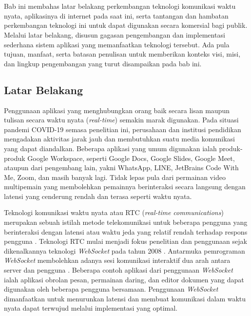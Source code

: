 \chapter{\babSatu}
\label{bab:1}
Bab ini membahas latar belakang perkembangan teknologi komunikasi waktu nyata, aplikasinya di internet pada saat ini, serta tantangan dan hambatan perkembangan teknologi ini untuk dapat digunakan secara komersial bagi publik. Melalui latar belakang, disusun gagasan pengembangan dan implementasi sederhana sistem aplikasi yang memanfaatkan teknologi tersebut. Ada pula tujuan, manfaat, serta batasan penulisan untuk memberikan konteks visi, misi, dan lingkup pengembangan yang turut disampaikan pada bab ini.

\section{Latar Belakang}
\label{sec:latarBelakang}
Penggunaan aplikasi yang menghubungkan orang baik secara lisan maupun tulisan secara waktu nyata (\textit{real-time}) semakin marak digunakan. Pada situasi pandemi COVID-19 semasa penelitian ini, perusahaan dan institusi pendidikan mengadakan aktivitas jarak jauh dan membutuhkan suatu media komunikasi yang dapat diandalkan. Beberapa aplikasi yang umum digunakan ialah produk-produk Google Workspace, seperti Google Docs, Google Slides, Google Meet, ataupun dari pengembang lain, yakni WhatsApp, LINE, JetBrains Code With Me, Zoom, dan masih banyak lagi. Tidak lepas pula dari permainan video multipemain yang membolehkan pemainnya berinteraksi secara langsung dengan latensi yang cenderung rendah dan terasa seperti waktu nyata.

Teknologi komunikasi waktu nyata atau RTC (\textit{real-time communications}) merupakan sebuah istilah metode telekomunikasi untuk beberapa pengguna yang berinteraksi dengan latensi atau waktu jeda yang relatif rendah terhadap respons pengguna \citep{arefin2013modified}. Teknologi RTC mulai menjadi fokus penelitian dan penggunaan sejak dikenalkannya teknologi \textit{WebSocket} pada tahun 2008 \citep{fette2011websocket, reynolds2008web}. Antarmuka pemrograman \textit{WebSocket} membolehkan adanya sesi komunikasi interaktif dua arah antara server dan pengguna \citep{fette2011websocket}. Beberapa contoh aplikasi dari penggunaan \textit{WebSocket} ialah aplikasi obrolan pesan, permainan daring, dan editor dokumen yang dapat digunakan oleh beberapa pengguna bersamaan. Penggunaan \textit{WebSocket} dimanfaatkan untuk menurunkan latensi dan membuat komunikasi dalam waktu nyata dapat terwujud melalui implementasi yang optimal.

